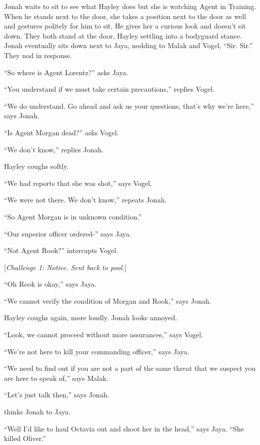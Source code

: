 Jonah waits to sit to see what Hayley does but she is watching Agent in Training.  When he stands next to the door, she takes a position next to the door as well and gestures politely for him to sit.  He gives her a curious look and doesn't sit down.  They both stand at the door, Hayley settling into a bodyguard stance.  Jonah eventually sits down next to Jaya, nodding to Malak and Vogel, ``Sir.  Sir.''  They nod in response.



``So where is Agent Lorentz?'' asks Jaya.

``You understand if we must take certain precautions,'' replies Vogel.

``We do understand.  Go ahead and ask us your questions, that's why we're here,'' says Jonah.

``Is Agent Morgan dead?'' asks Vogel.

``We don't know,'' replies Jonah.

Hayley coughs softly.

``We had reports that she was shot,'' says Vogel.

``We were not there.  We don't know,'' repeats Jonah.

``So Agent Morgan is in unknown condition.''

``Our superior officer ordered-'' says Jaya.

``Not Agent Rook?'' interrupts Vogel.

{[}\textit{Challenge 1: Notice.  Sent back to pool.}{]}

``Oh Rook is okay,'' says Jaya.

``We cannot verify the condition of Morgan and Rook,'' says Jonah.

Hayley coughs again, more loudly.  Jonah looks annoyed.

``Look, we cannot proceed without more assurances,'' says Vogel.

``We're not here to kill your commanding officer,'' says Jaya.

``We need to find out if you are not a part of the same threat that we suspect you are here to speak of,'' says Malak.

``Let's just talk then,'' says Jonah.

  thinks Jonah to Jaya.

``Well I'd like to haul Octavia out and shoot her in the head,'' says Jaya.  ``She killed Oliver.''

